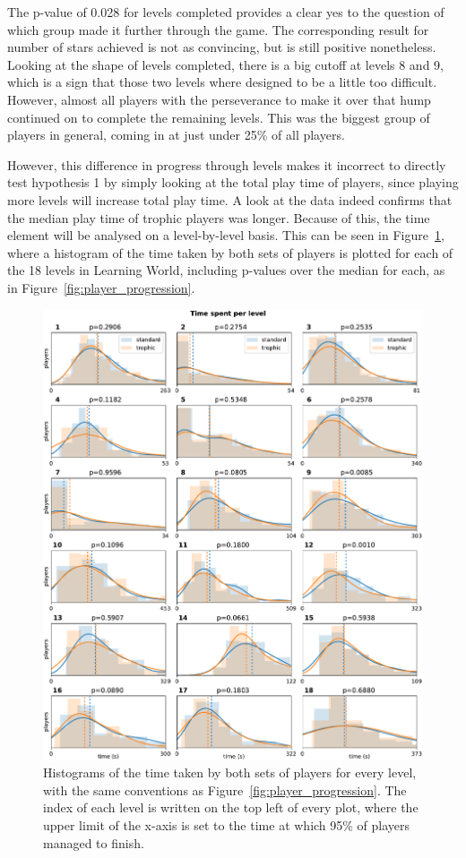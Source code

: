 The p-value of 0.028 for levels completed provides a clear yes to the question of which group made it further through the game. The corresponding result for number of stars achieved is not as convincing, but is still positive nonetheless.
Looking at the shape of levels completed, there is a big cutoff at levels 8 and 9, which is a sign that those two levels where designed to be a little too difficult. However, almost all players with the perseverance to make it over that hump continued on to complete the remaining levels. This was the biggest group of players in general, coming in at just under 25\% of all players.

However, this difference in progress through levels makes it incorrect to directly test hypothesis 1 by simply looking at the total play time of players, since playing more levels will increase total play time. A look at the data indeed confirms that the median play time of trophic players was longer.
Because of this, the time element will be analysed on a level-by-level basis. This can be seen in Figure~\ref{fig:level_times}, where a histogram of the time taken by both sets of players is plotted for each of the 18 levels in Learning World, including p-values over the median for each, as in Figure~\ref{fig:player_progression}.

\begin{figure}
    \centering
    \includegraphics[width=\textwidth]{joy/times.pdf}
    \caption[Histograms showing the time spent on each level]{Histograms of the time taken by both sets of players for every level, with the same conventions as Figure~\ref{fig:player_progression}. The index of each level is written on the top left of every plot, where the upper limit of the x-axis is set to the time at which 95\% of players managed to finish.}
    \label{fig:level_times}
\end{figure}

